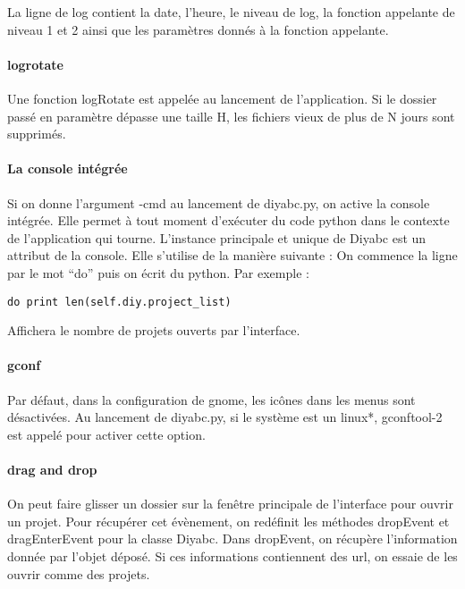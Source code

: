 \documentclass[12pt,a4paper]{article}
\begin{document}
        La ligne de log contient la date, l'heure, le niveau de log, la fonction appelante de niveau 1 et 2 ainsi que les paramètres
        donnés à la fonction appelante. 
        
        \paragraph{logrotate}
        Une fonction logRotate est appelée au lancement de l'application. Si le dossier passé en paramètre dépasse une taille H,
        les fichiers vieux de plus de N jours sont supprimés.

        \paragraph{La console intégrée}
        Si on donne l'argument -cmd au lancement de diyabc.py, on active la console intégrée. Elle permet à tout moment d'exécuter du code python
        dans le contexte de l'application qui tourne. L'instance principale et unique de Diyabc est un attribut de la console. Elle s'utilise de la
        manière suivante : \newline On commence la ligne par le mot ``do'' puis on écrit du python. Par exemple : 

        \begin{verbatim}do print len(self.diy.project_list)\end{verbatim}
        
        Affichera le nombre de projets ouverts par l'interface.

        \paragraph{gconf}
        Par défaut, dans la configuration de gnome, les icônes dans les menus sont désactivées. Au lancement de diyabc.py,
        si le système est un linux*, gconftool-2 est appelé pour activer cette option.

        \paragraph{drag and drop}
        On peut faire glisser un dossier sur la fenêtre principale de l'interface pour ouvrir un projet. Pour récupérer 
        cet évènement, on redéfinit les méthodes dropEvent et dragEnterEvent pour la classe Diyabc. Dans dropEvent, on
        récupère l'information donnée par l'objet déposé. Si ces informations contiennent des url, on essaie de les ouvrir 
        comme des projets.
\end{document}
